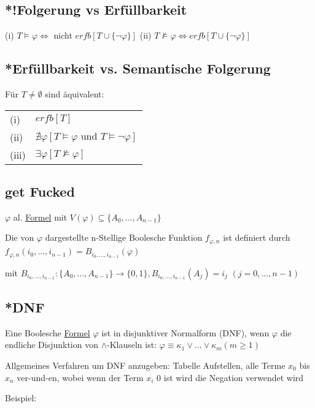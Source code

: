 \documentclass[12pt,a4paper]{article} %
\begin{document}
	\subsection{*!Folgerung vs Erfüllbarkeit}
	(i) $T \hyperref[Erfullbar]{\vDash} \varphi \Leftrightarrow$ nicht $erfb[T \cup \{\neg \varphi\}]$ \newline
	(ii) $T \nvDash \varphi \Leftrightarrow erfb[T \cup \{\neg \varphi\}]$
	
	\subsection{*Erfüllbarkeit vs. Semantische Folgerung}
	Für $T \ne \emptyset$ sind äquivalent:
	
	\begin{tabular}{l l}
		(i) & $erfb[T]$ \\
		(ii) & $\nexists \varphi[T \hyperref[Erfullbar]{\vDash} \varphi \text{ und } T \hyperref[Erfullbar]{\vDash} \neg \varphi]$ \\
		(iii) & $\exists \varphi [T \nvDash \varphi]$
	\end{tabular}

	\subsection{get Fucked}
	$\varphi$ al. \hyperref[Formel]{Formel} mit $V(\varphi) \subseteq \{A_0, ..., A_{n - 1}\}$
	
	Die von $\varphi$ dargestellte n-Stellige Boolesche Funktion $f_{\varphi, n}$ ist definiert durch $f_{\varphi, n}(i_0, ..., i_{n-1}) = \widehat{B}_{i_0, ..., i_{n - 1}}(\varphi)$
	
	mit $B_{i_0, ..., i_{n - 1}}: \{A_0, ..., A_{n - 1}\} \rightarrow \{0, 1\}, B_{i_0, ..., i_{n - 1}}(A_j) = i_j$ $(j = 0, ..., n - 1)$
	
	\subsection{*DNF}
	\label{DNF}
	Eine Boolesche \hyperref[Formel]{Formel} $\varphi$ ist in disjunktiver Normalform (DNF), wenn
	$\varphi$ die endliche Disjunktion von $\land$-Klauseln ist: $\varphi \equiv \kappa_1 \lor ... \lor \kappa_m (m \ge 1)$
	
	Allgemeines Verfahren um DNF anzugeben: Tabelle Aufstellen, alle Terme $x_0$ bis $x_n$ ver-und-en, wobei wenn der Term $x_i$ 0 ist wird die Negation verwendet wird
	
	Beispiel:
	
\end{document}
